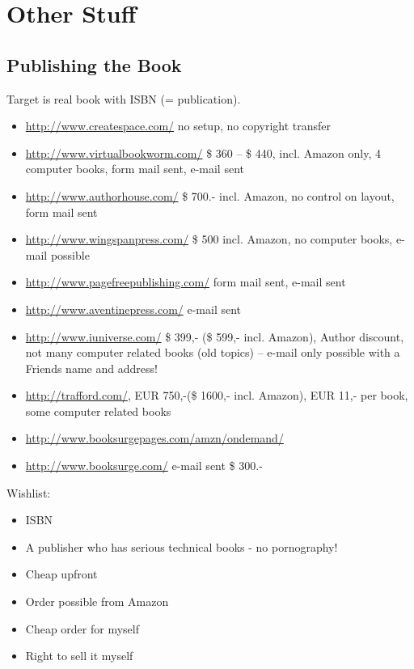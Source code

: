 \chapter{Other Stuff}

\section{Publishing the Book}

Target is real book with ISBN (= publication).

\begin{itemize}
    \item \url{http://www.createspace.com/} no setup, no
        copyright transfer
    \item \url{http://www.virtualbookworm.com/} \$ 360 -- \$ 440, incl. Amazon only, 4 computer
    books, form mail sent, e-mail sent
    \item \url{http://www.authorhouse.com/} \$ 700.- incl. Amazon,
    no control on layout, form mail sent
    \item \url{http://www.wingspanpress.com/} \$ 500 incl. Amazon,
    no computer books, e-mail possible
    \item \url{http://www.pagefreepublishing.com/} form mail sent,
    e-mail sent
    \item \url{http://www.aventinepress.com/} e-mail sent
    \item \url{http://www.iuniverse.com/} \$ 399,- (\$ 599,- incl.
    Amazon), Author discount, not many computer related books (old
    topics) -- e-mail only possible with a Friends name and address!
    \item \url{http://trafford.com/}, EUR 750,-(\$ 1600,- incl. Amazon), EUR 11,- per
    book, some computer related books
    \item \url{http://www.booksurgepages.com/amzn/ondemand/}
    \item \url{http://www.booksurge.com/} e-mail sent \$ 300.-
\end{itemize}

Wishlist:
\begin{itemize}
    \item ISBN
    \item A publisher who has serious technical books - no pornography!
    \item Cheap upfront
    \item Order possible from Amazon
    \item Cheap order for myself
    \item Right to sell it myself
\end{itemize}

